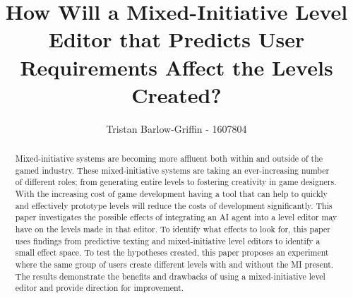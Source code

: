 \documentclass[journal]{IEEEtran}
\begin{document}
%
\title{ How Will a Mixed-Initiative Level Editor that Predicts User Requirements Affect the Levels Created?}
%
%

\author{Tristan Barlow-Griffin - 1607804}


\maketitle

\begin{abstract}
Mixed-initiative systems are becoming more affluent both within and outside of the gamed industry. These mixed-initiative systems are taking an ever-increasing number of different roles; from generating entire levels to fostering creativity in game designers. With the increasing cost of game development having a tool that can help to quickly and effectively prototype levels will reduce the costs of development significantly.
This paper investigates the possible effects of integrating an AI agent into a level editor may have on the levels made in that editor. To identify what effects to look for, this paper uses findings from predictive texting and mixed-initiative level editors to identify a small effect space. To test the hypotheses created, this paper proposes an experiment where the same group of users create different levels with and without the MI present. The results demonstrate the benefits and drawbacks of using a mixed-initiative level editor and provide direction for improvement.
\end{abstract}
\end{document}
